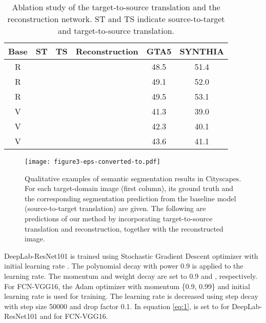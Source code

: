 \documentclass[runningheads]{llncs}
\begin{document}
	\newcommand{\cmark}{\ding{51}}\begin{table}[t]
		\caption{Ablation study of the target-to-source translation and the reconstruction network. ST and TS indicate source-to-target and target-to-source translation. }
		\label{table:ablation_gta2city}
		
		\footnotesize
		\setlength\tabcolsep{5pt}
		\begin{center}
			\begin{tabularx}{.73\textwidth}{ cccc|c|c @{} }
				\toprule
Base & ST &  TS & Reconstruction & GTA5 & SYNTHIA \\
				\midrule
R & \cmark & & & 48.5 & 51.4 \\
				R & & \cmark & & 49.1 & 52.0 \\
				R & & \cmark & \cmark & 49.5 & 53.1 \\                       
				\midrule
				
V & \cmark & & & 41.3 & 39.0 \\
				V & & \cmark & & 42.3 & 40.1 \\
				V & & \cmark & \cmark & 43.6 & 41.1 \\
				
				\bottomrule
			\end{tabularx}
		\end{center}
\end{table}
	
	\begin{figure*}
\begin{center}
\texttt{[image: figure3-eps-converted-to.pdf]}
		\end{center}
		\caption{Qualitative examples of semantic segmentation results in Cityscapes. For each target-domain image (first column), its ground truth and the corresponding segmentation prediction from the baseline model (source-to-target translation) are given. The following are predictions of our method by incorporating target-to-source translation and reconstruction, together with the reconstructed image.}
		\label{fig:quali_gta2city}
\end{figure*}
	
	DeepLab-ResNet101 is trained using Stochastic Gradient Descent optimizer with initial learning rate . The polynomial decay with power 0.9 is applied to the learning rate. The momentum and weight decay are set to 0.9 and , respectively. For FCN-VGG16, the Adam optimizer with momentum \{0.9, 0.99\} and initial learning rate  is used for training. The learning rate is decreased using step decay with step size 50000 and drop factor 0.1. In equation \ref{eq:1},  is set to  for DeepLab-ResNet101 and  for FCN-VGG16.
	
\end{document}
